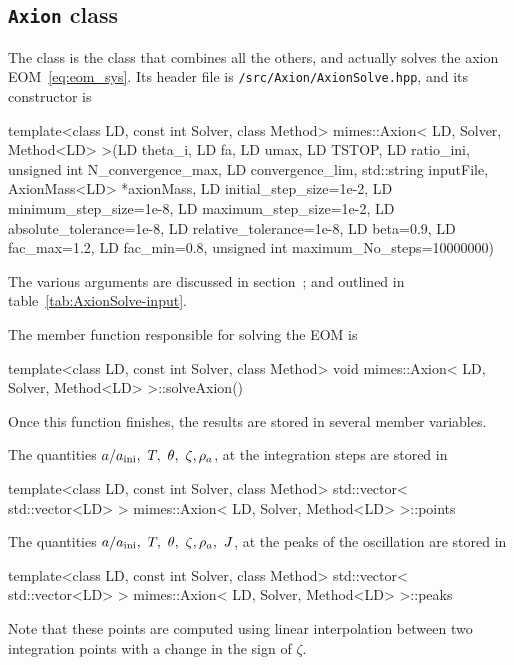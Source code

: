 \documentclass[11pt,a4paper]{article}
\begin{document}
\subsection{{\tt Axion} class}
%
The  class is the class that combines all the others, and actually solves the axion EOM~\ref{eq:eom_sys}. Its header file is {\tt \mimes/src/Axion/AxionSolve.hpp}, and its constructor is
%
\begin{cpp}
 	template<class LD, const int Solver, class Method>
	mimes::Axion< LD, Solver, Method<LD> >(LD theta_i, LD fa, LD umax, LD TSTOP, 
	LD ratio_ini, unsigned int N_convergence_max, LD convergence_lim, 
	std::string inputFile, AxionMass<LD> *axionMass, LD initial_step_size=1e-2, 
	LD minimum_step_size=1e-8, LD maximum_step_size=1e-2, LD absolute_tolerance=1e-8, 
	LD relative_tolerance=1e-8, LD beta=0.9, LD fac_max=1.2, LD fac_min=0.8, 
	unsigned int maximum_No_steps=10000000)
\end{cpp}
%
The various arguments are discussed in section~; and outlined in table~\ref{tab:AxionSolve-input}.
%

The member function responsible for solving the EOM is
%
\begin{cpp}
	template<class LD, const int Solver, class Method>
	void mimes::Axion< LD, Solver, Method<LD> >::solveAxion()
\end{cpp}
%
Once this function finishes, the results are stored in several member variables.

The quantities $a/\ai, \ T, \ \theta, \ \zeta, \rho_a$, at the integration  steps are stored in
%
\begin{cpp}
	template<class LD, const int Solver, class Method> 
	std::vector< std::vector<LD> > mimes::Axion< LD, Solver, Method<LD> >::points
\end{cpp}
%

The quantities $a/\ai, \ T, \ \theta, \ \zeta, \rho_a, \ J$, at the peaks of the oscillation are stored in 
%
\begin{cpp}
	template<class LD, const int Solver, class Method> 
	std::vector< std::vector<LD> > mimes::Axion< LD, Solver, Method<LD> >::peaks
\end{cpp}
%
Note that these points are computed using linear interpolation between two integration points with a change in the sign of $\zeta$.
\end{document}
